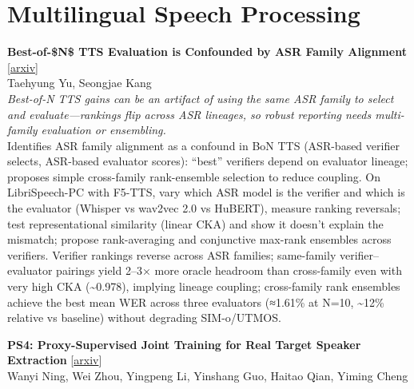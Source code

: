 \documentclass[12pt,letterpaper]{article}
\begin{document}
\medskip


\section*{Multilingual Speech Processing}

{\small\textbf{Best-of-\$N\$ TTS Evaluation is Confounded by ASR Family Alignment}} {\scriptsize[\href{https://arxiv.org/abs/2607.08256}{arxiv}]}\\
{\scriptsize Taehyung Yu, Seongjae Kang}\\

{\small\textit{Best-of-N TTS gains can be an artifact of using the same ASR family to select and evaluate---rankings flip across ASR lineages, so robust reporting needs multi-family evaluation or ensembling.}}\\[1pt]
{\footnotesize Identifies ASR family alignment as a confound in BoN TTS (ASR-based verifier selects, ASR-based evaluator scores): ``best'' verifiers depend on evaluator lineage; proposes simple cross-family rank-ensemble selection to reduce coupling. On LibriSpeech-PC with F5-TTS, vary which ASR model is the verifier and which is the evaluator (Whisper vs wav2vec 2.0 vs HuBERT), measure ranking reversals; test representational similarity (linear CKA) and show it doesn't explain the mismatch; propose rank-averaging and conjunctive max-rank ensembles across verifiers. Verifier rankings reverse across ASR families; same-family verifier--evaluator pairings yield 2--3× more oracle headroom than cross-family even with very high CKA (\textasciitilde{}0.978), implying lineage coupling; cross-family rank ensembles achieve the best mean WER across three evaluators (≈1.61\% at N=10, \textasciitilde{}12\% relative vs baseline) without degrading SIM-o/UTMOS.}

\medskip

{\small\textbf{PS4: Proxy-Supervised Joint Training for Real Target Speaker Extraction}} {\scriptsize[\href{https://arxiv.org/abs/2607.08111}{arxiv}]}\\
{\scriptsize Wanyi Ning, Wei Zhou, Yingpeng Li, Yinshang Guo, Haitao Qian, Yiming Cheng}\\
\end{document}
